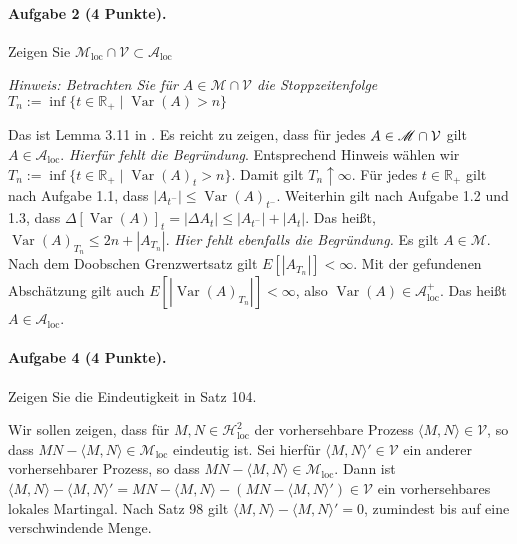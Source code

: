 \documentclass{article}
\begin{document}
\paragraph{Aufgabe 2 \textnormal{(4 Punkte)}.}
Zeigen Sie $\mathscr{M}_{\text{loc}}\cap\mathcal{V}\subset\mathscr{A}_{\text{loc}}$

\noindent\emph{Hinweis: Betrachten Sie für $A\in\mathscr{M}\cap\mathcal{V}$ die Stoppzeitenfolge $T_n:=\inf\{t\in\mathbb{R}_+\mid\operatorname{Var}(A)>n\}$}

Das ist Lemma 3.11 in \cite{jacod2013limit}.
Es reicht zu zeigen, dass für jedes $A\in\mathscr{M}\cap{\cal V}$ gilt $A\in\mathscr{A}_{\text{loc}}$.
\emph{Hierfür fehlt die Begründung}.
Entsprechend Hinweis wählen wir $T_n:=\inf\{t\in\mathbb{R}_+\mid\operatorname{Var}(A)_t>n\}$.
Damit gilt $T_n\uparrow\infty$.
Für jedes $t\in\mathbb{R}_+$ gilt nach Aufgabe 1.1, dass $|A_{t^-}|\leq\operatorname{Var}(A)_{t^-}$.
Weiterhin gilt nach Aufgabe 1.2 und 1.3, dass $\Delta[\operatorname{Var}(A)]_t=|\Delta A_t|\leq|A_{t^-}|+|A_t|$.
Das heißt, $\operatorname{Var}(A)_{T_n}\leq 2n+|A_{T_n}|$.
\emph{Hier fehlt ebenfalls die Begründung.}
Es gilt $A\in\mathscr{M}$.
Nach dem Doobschen Grenzwertsatz gilt $E[|A_{T_n}|]<\infty$.
Mit der gefundenen Abschätzung gilt auch $E[|\operatorname{Var}(A)_{T_n}|]<\infty$, also $\operatorname{Var}(A)\in\mathscr{A}_{\text{loc}}^+$.
Das heißt $A\in\mathscr{A}_{\text{loc}}$.

\paragraph{Aufgabe 4 \textnormal{(4 Punkte)}.}
Zeigen Sie die Eindeutigkeit in Satz 104.

Wir sollen zeigen, dass für $M,N\in\mathscr{H}^2_{\text{loc}}$ der vorhersehbare Prozess $\langle M,N\rangle\in\mathscr{V}$, so dass $MN-\langle M,N\rangle\in\mathscr{M}_{\text{loc}}$ eindeutig ist.
Sei hierfür $\langle M,N\rangle'\in\mathscr{V}$ ein anderer vorhersehbarer Prozess, so dass $MN-\langle M,N\rangle\in\mathscr{M}_{\text{loc}}$.
Dann ist $\langle M,N\rangle-\langle M,N\rangle'=MN-\langle M,N\rangle-(MN-\langle M,N\rangle')\in\mathscr{V}$ ein vorhersehbares lokales Martingal.
Nach Satz 98 gilt $\langle M,N\rangle-\langle M,N\rangle'=0$, zumindest bis auf eine verschwindende Menge.

\end{document}
